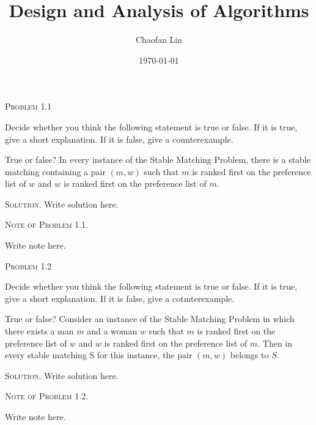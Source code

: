 \documentclass[12pt, a4paper, oneside]{article}
\title{\textbf{Design and Analysis of Algorithms}}
\author{Chaofan Lin}
\date{\today}
\newenvironment{problem}[1]{
    \begin{shaded}\par\noindent\textsc{Problem {#1}}
}
{\end{shaded}\par}
\newenvironment{solution}{\par\noindent\textsc{Solution. }}{\\\par}
\newenvironment{note}[1]{
    \par\noindent\textsc{Note of Problem {#1}. }
}
{\\\par}
\begin{document}
\maketitle

\begin{problem}{1.1}
Decide whether you think the following statement is true or false. If it is true, give a short explanation. If it is false, give a counterexample.

True or false? In every instance of the Stable Matching Problem, there is a
stable matching containing a pair $(m, w)$ such that $m$ is ranked first on the
preference list of $w$ and $w$ is ranked first on the preference list of $m$.
\end{problem}

\begin{solution}
    Write solution here.
\end{solution}

\begin{note}{1.1}
    Write note here.
\end{note}

\begin{problem}{1.2}
Decide whether you think the following statement is true or false. If it is
true, give a short explanation. If it is false, give a cotmterexample.

True or false? Consider an instance of the Stable Matching Problem in which
there exists a man $m$ and a woman $w$ such that $m$ is ranked first on the
preference list of $w$ and $w$ is ranked first on the preference list of $m$. Then in
every stable matching S for this instance, the pair $(m, w)$ belongs to $S$.
\end{problem}

\begin{solution}
    Write solution here.
\end{solution}

\begin{note}{1.2}
    Write note here.
\end{note}
\end{document}

